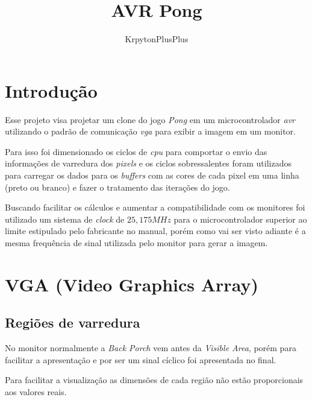 \documentclass[twocolumn]{article}
\title{AVR Pong}
\author{KrpytonPlusPlus}
\begin{document}
\maketitle

\section{Introdução}
    Esse projeto visa projetar um clone do jogo \textsl{Pong} em um microcontrolador \textsl{avr} utilizando o padrão de comunicação \textsl{vga} para exibir a imagem em um monitor.

    Para isso foi dimensionado os ciclos de \textsl{cpu} para comportar o envio das informações de varredura dos \textsl{pixels} e os ciclos sobressalentes foram utilizados para carregar os dados para os \textsl{buffers} com as cores de cada pixel em uma linha (preto ou branco) e fazer o tratamento das iterações do jogo.

    Buscando facilitar os cálculos e aumentar a compatibilidade com os monitores foi utilizado um sistema de \textsl{clock} de \(25{,}175MHz\) para o microcontrolador superior ao limite estipulado pelo fabricante no manual, porém como vai ser visto adiante é a mesma frequência de sinal utilizada pelo monitor para gerar a imagem.

\section{VGA (Video Graphics Array)}
    \subsection{Regiões de varredura}
    
    

    No monitor normalmente a \textsl{Back Porch} vem antes da \textsl{Visible Area}, porém para facilitar a apresentação e por ser um sinal cíclico foi apresentada no final.

    Para facilitar a visualização as dimensões de cada região não estão proporcionais aos valores reais.
    
\end{document}
